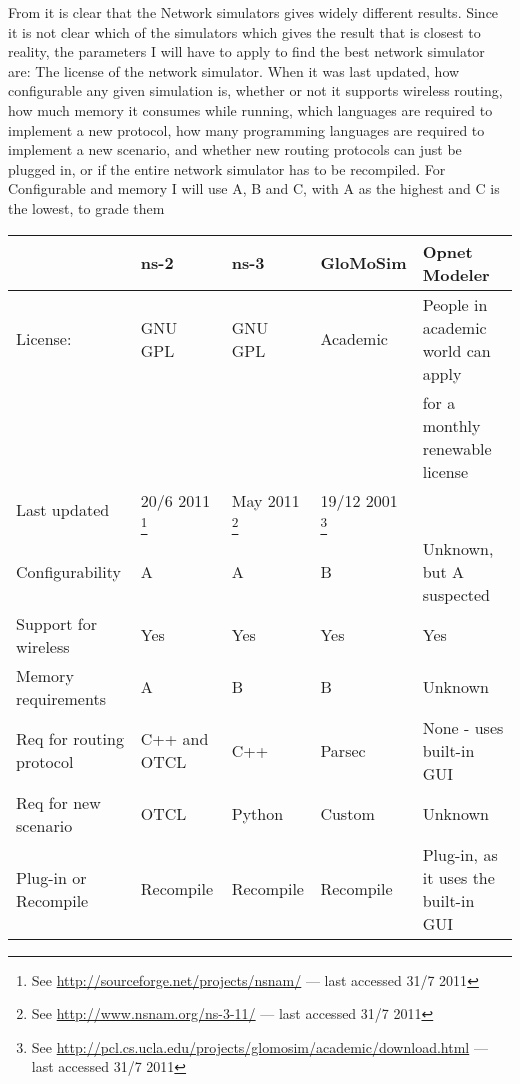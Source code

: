 From \cite{MANcom} it is clear that the Network simulators gives widely different results. Since it is not clear which of the simulators which gives the result that is closest to reality, the parameters I will have to apply to find the best network simulator are: The license of the network simulator. When it was last updated, how configurable any given simulation is, whether or not it supports wireless routing, how much memory it consumes while running, which languages are required to implement a new protocol, how many programming languages are required to implement a new scenario, and whether new routing protocols can just be plugged in, or if the entire network simulator has to be recompiled. For Configurable and memory I will use A, B and C, with A as the highest and C is the lowest, to grade them\\
\begin{scriptsize}
\begin{minipage}{15.0cm}
\begin{tabular}[4]{lllll}
                          & ns-2      & ns-3      & GloMoSim & Opnet Modeler \\
\hline
License:                  & GNU GPL   & GNU GPL   & Academic & People in academic world can apply\\        &           &           &          & for a monthly renewable license \\
Last updated              & 20/6 2011
\footnote{\scriptsize{See \url{http://sourceforge.net/projects/nsnam/} --- last accessed 31/7 2011}} & May 2011
\footnote{\scriptsize{See \url{http://www.nsnam.org/ns-3-11/} --- last accessed 31/7 2011}} & 19/12 2001
\footnote{\scriptsize{See \url{http://pcl.cs.ucla.edu/projects/glomosim/academic/download.html} --- last accessed 31/7 2011}}  & \\
Configurability           & A         & A         & B         & Unknown, but A suspected\\
Support for wireless      & Yes       & Yes       & Yes       & Yes \\
Memory requirements       & A         & B         & B         & Unknown\\
Req for routing protocol  & C++ and OTCL & C++    & Parsec    & None - uses built-in GUI\\
Req for new scenario      & OTCL      & Python    & Custom    & Unknown \\
Plug-in or Recompile      & Recompile & Recompile & Recompile & Plug-in, as it uses the built-in GUI
\end{tabular}
\end{minipage}
\end{scriptsize}

